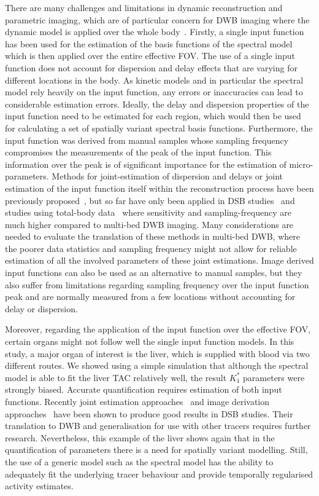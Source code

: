 There are many challenges and limitations in dynamic reconstruction and parametric imaging, which are of particular concern for DWB imaging where the dynamic model is applied over the whole body~\cite{Gallezot2019}. 
Firstly, a single input function has been used for the estimation of the basis functions of the spectral model which is then applied over the entire effective FOV. The use of a single input function does not account for dispersion and delay effects that are varying for different locations in the body. As kinetic models and in particular the spectral model rely heavily on the input function, any errors or inaccuracies can lead to considerable estimation errors. Ideally, the delay and dispersion properties of the input function need to be estimated for each region, which would then be used for calculating a set of spatially variant spectral basis functions.
Furthermore, the input function was derived from manual samples whose sampling frequency compromises the measurements of the peak of the input function. This information over the peak is of significant importance for the estimation of micro-parameters. 
Methods for joint-estimation of dispersion and delays or joint estimation of the input function itself within the reconstruction process have been previously proposed~\cite{Wang2013,Reader2014}, but so far have only been applied in DSB studies~\cite{Reader2014} and studies using total-body data~\cite{Feng2019} where sensitivity and sampling-frequency are much higher compared to multi-bed DWB imaging.
Many considerations are needed to evaluate the translation of these methods in multi-bed DWB, where the poorer data statistics and sampling frequency might not allow for reliable estimation of all the involved parameters of these joint estimations. 
Image derived input functions can also be used as an alternative to manual samples, but they also suffer from limitations regarding sampling frequency over the input function peak and are normally measured from a few locations without accounting for delay or dispersion. 

Moreover, regarding the application of the input function over the effective FOV, certain organs might not follow well the single input function models. 
In this study, a major organ of interest is the liver, which is supplied with blood via two different routes. We showed using a simple simulation that although the spectral model is able to fit the liver TAC relatively well, the result $K_1^{*}$ parameters were strongly biased. Accurate quantification requires estimation of both input functions. Recently joint estimation approaches~\cite{Wang2018} and image derivation approaches~\cite{Wang2021} have been shown to produce good results in DSB studies. Their translation to DWB and generalisation for use with other tracers requires further research. Nevertheless, this example of the liver shows again that in the quantification of parameters there is a need for spatially variant modelling. Still, the use of a generic model such as the spectral model has the ability to adequately fit the underlying tracer behaviour and provide temporally regularised activity estimates.

